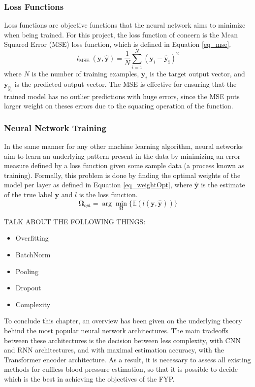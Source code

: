  \subsubsection{Loss Functions}
 Loss functions are objective functions that the neural network aims to minimize when being
trained. For this project, the loss function of concern is the Mean Squared Error (MSE) loss function, which is defined in 
Equation \ref{eq_mse}.
\begin{equation}\label{eq_mse}
    l_\text{MSE }(\mathbf{y}, \mathbf{\hat{y}}) = \frac{1}{N} \sum_{i=1}^N (\mathbf{y}_i - \mathbf{\hat{y}_i})^2
\end{equation}\noindent where $N$ is the number of training examples, $\mathbf{y}_i$ is the target output vector, and $\mathbf{y}_{\hat{y}_i}$ is the predicted output vector.
The MSE is effective for ensuring that the trained model has no outlier predictions 
with huge errors, since the MSE puts larger weight on theses errors due to the squaring 
operation of the function.

 \subsubsection{Neural Network Training}
 In the same manner for any other machine learning algorithm, neural networks aim to learn an underlying pattern
 present in the data by minimizing an error measure defined by a loss function given some
 sample data (a process known as training). Formally, this problem is done by finding the
 optimal weights of the model per layer as defined in Equation \ref{eq_weightOpt}, where $\mathbf{\hat{y}}$ is the estimate of
 the true label $\mathbf{y}$ and $l$ is the loss function.
 \begin{equation}\label{eq_weightOpt}
    \mathbf{\Omega}_{opt} = \arg \min_{\mathbf{\Omega}} \{\mathbb{E}(l(\mathbf{y}, \mathbf{\hat{y}}))\}
 \end{equation}

TALK ABOUT THE FOLLOWING THINGS:

\begin{itemize}
  \item Overfitting
  \item BatchNorm
  \item Pooling
  \item Dropout
  \item Complexity
\end{itemize}

To conclude this chapter, an overview has been given on the underlying theory behind 
the most popular neural network architectures. The main tradeoffs between these architectures 
is the decision between less complexity, with CNN and RNN architectures, and with maximal 
estimation accuracy, with the Transformer encoder architecture. As a result, it is necessary 
to assess all existing methods for cuffless blood pressure estimation, so that it is possible 
to decide which is the best in achieving the objectives of the FYP.


